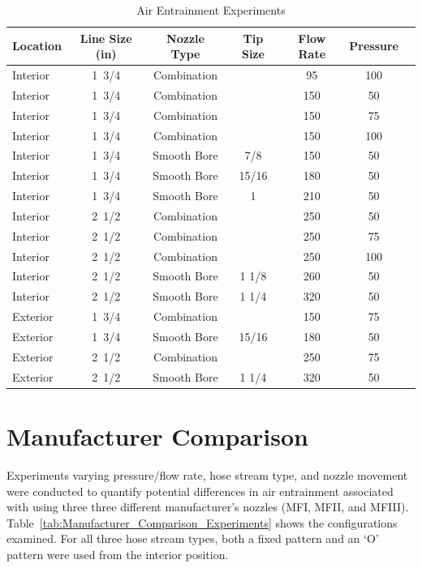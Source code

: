 \documentclass[12pt,oneside]{book}
\begin{document}
\begin{table}[!ht]
\centering
\caption{Air Entrainment Experiments}
\label{tab:Total_Air_Entrainment_Experiments}
\begin{tabular}{lcccccc}
\toprule[1.5pt]
Location & Line Size (in) & Nozzle Type & Tip Size & Flow Rate & Pressure \\ 
\midrule
Interior & 1~3/4 & Combination &       & 95 & 100 \\
Interior & 1~3/4 & Combination &       & 150 & 50 \\
Interior & 1~3/4 & Combination &       & 150 & 75 \\
Interior & 1~3/4 & Combination &       & 150 & 100 \\
Interior & 1~3/4 & Smooth Bore & 7/8   & 150 & 50 \\
Interior & 1~3/4 & Smooth Bore & 15/16 & 180 & 50 \\
Interior & 1~3/4 & Smooth Bore & 1     & 210 & 50 \\
\midrule
Interior & 2~1/2 & Combination &       & 250 & 50 \\
Interior & 2~1/2 & Combination &       & 250 & 75 \\
Interior & 2~1/2 & Combination &       & 250 & 100 \\
Interior & 2~1/2 & Smooth Bore & 1 1/8 & 260 & 50 \\
Interior & 2~1/2 & Smooth Bore & 1 1/4 & 320 & 50 \\
\midrule
Exterior & 1~3/4 & Combination &       & 150 & 75 \\
Exterior & 1~3/4 & Smooth Bore & 15/16 & 180 & 50 \\
\midrule
Exterior & 2~1/2 & Combination &       & 250 & 75 \\
Exterior & 2~1/2 & Smooth Bore & 1 1/4 & 320 & 50 \\
\bottomrule[1.25pt]
\end{tabular}
\end{table}


\clearpage

\section{Manufacturer Comparison}

Experiments varying pressure/flow rate, hose stream type, and nozzle movement were conducted to quantify potential differences in air entrainment associated with using three three different manufacturer's nozzles (MFI, MFII, and MFIII). Table~\ref{tab:Manufacturer_Comparison_Experiments} shows the configurations examined. For all three hose stream types, both a fixed pattern and an `O' pattern were used from the interior position.
\end{document}
